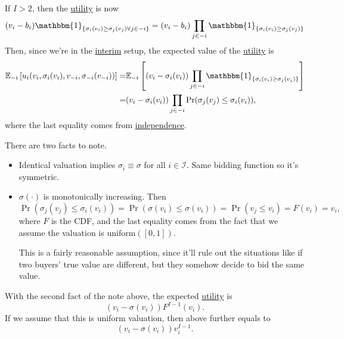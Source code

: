 If \(I>2\), then the \hyperref[def:reward]{utility}  is now
\[
	(v_{i} - b_{i})\mathbbm{1}_{\{ \sigma_{i}(v_{i})\geq \sigma_{j}(v_{j})\forall j\in -i \}} = (v_{i} - b_{i})\prod\limits_{j\in -i} \mathbbm{1}_{\{ \sigma_{i}(v_{i})\geq \sigma_{j}(v_{j}) \}}
\]
Then, since we're in the \hyperref[def:interim]{interim} setup, the expected value of the \hyperref[def:reward]{utility}  is
\[
	\begin{split}
		\mathbb{E}_{-i}\left[u_{i}(v_{i}, \sigma_{i}(v_{i}), v_{-i}, \sigma_{-i}(v_{-i})) \right]
		= &\mathbb{E}_{-i}\left[(v_{i} - \sigma_{i}(v_{i})) \prod\limits_{j\in -i}\mathbbm{1}_{\{ \sigma_{i}(v_{i})\geq \sigma_{j}(v_{j}) \}} \right]\\
		= &(v_{i} - \sigma_{i}(v_{i}))\prod\limits_{j\in -i}\Pr(\sigma_{j}(v_{j})\leq \sigma_{i}(v_{i})),
	\end{split}
\]
where the last equality comes from \hyperref[def:independent]{independence}.

\begin{note}
	There are two facts to note.
	\begin{itemize}
		\item Identical valuation implies \(\sigma_{i} \equiv \sigma\) for all \(i\in \mathcal{I} \). Same bidding function so it's symmetric.
		\item \(\sigma(\cdot)\) is monotonically increasing. Then
		      \[
			      \Pr(\sigma_{j}(v_{j})\leq \sigma_{i}(v_{i})) = \Pr(\sigma(v_{i})\leq \sigma(v_{i})) = \Pr(v_{j}\leq v_{i}) = F(v_{i}) = v_{i},
		      \]
		      where \(F\) is the CDF, and the last equality comes from the fact that we assume the valuation is \(\mathrm{uniform}([0, 1])\).

		      This is a fairly reasonable assumption, since it'll rule out the situations like if two buyers' true value are different, but they somehow decide to bid
		      the same value.
	\end{itemize}
\end{note}

With the second fact of the note above, the expected \hyperref[def:reward]{utility}  is
\[
	(v_{i} - \sigma(v_{i})) F^{I-1}(v_{i}).
\]
If we assume that this is uniform valuation, then above further equals to
\[
	(v_{i} - \sigma(v_{i}))v^{I-1}_{i}.
\]
